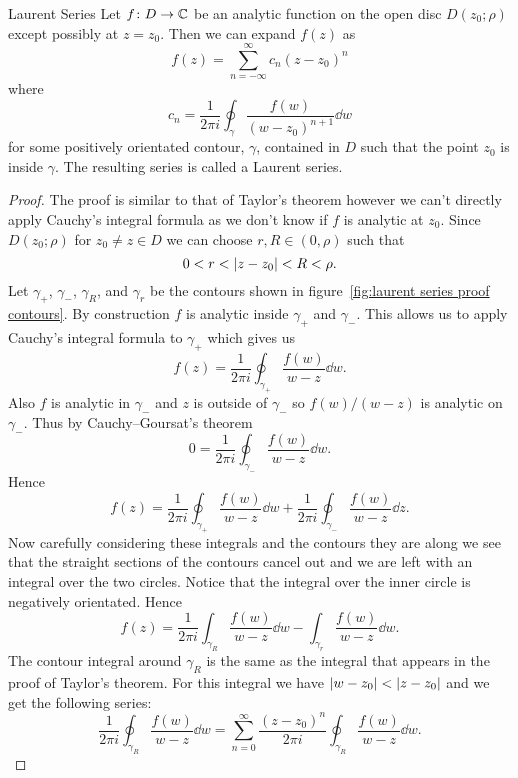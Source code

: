 \documentclass{article}
\newcommand{\discOpen}[2]{D\left({#1}; {#2}\right)}
\begin{document}
    \begin{theorem}{Laurent Series}{}
        Let \(f\colon D\to \mathbb{C}\) be an analytic function on the open disc \(\discOpen{z_0}{\rho}\) except possibly at \(z = z_0\).
        Then we can expand \(f(z)\) as
        \[f(z) = \sum_{n=-\infty}^{\infty} c_n(z - z_0)^n\]
        where
        \[c_n = \frac{1}{2\pi i}\oint_{\gamma} \frac{f(w)}{(w - z_0)^{n+1}}\dd{w}\]
        for some positively orientated contour, \(\gamma\), contained in \(D\) such that the point \(z_0\) is inside \(\gamma\).
        The resulting series is called a Laurent series.
    \end{theorem}
    \begin{proof}
        The proof is similar to that of Taylor's theorem however we can't directly apply Cauchy's integral formula as we don't know if \(f\) is analytic at \(z_0\).
        Since \(\discOpen{z_0}{\rho}\) for \(z_0\ne z \in D\) we can choose \(r, R\in(0, \rho)\) such that
        \[0 < r < \abs{z - z_0} < R < \rho.\]
        Let \(\gamma_+\), \(\gamma_-\), \(\gamma_R\), and \(\gamma_r\) be the contours shown in figure~\ref{fig:laurent series proof contours}.
        By construction \(f\) is analytic inside \(\gamma_+\) and \(\gamma_-\).
        This allows us to apply Cauchy's integral formula to \(\gamma_+\) which gives us
        \[f(z) = \frac{1}{2\pi i}\oint_{\gamma_+} \frac{f(w)}{w - z}\dd{w}.\]
        Also \(f\) is analytic in \(\gamma_-\) and \(z\) is outside of \(\gamma_-\) so \(f(w)/(w - z)\) is analytic on \(\gamma_-\).
        Thus by Cauchy--Goursat's theorem
        \[0 = \frac{1}{2\pi i}\oint_{\gamma_-}\frac{f(w)}{w - z}\dd{w}.\]
        Hence
        \[f(z) = \frac{1}{2\pi i}\oint_{\gamma_+}\frac{f(w)}{w - z}\dd{w} + \frac{1}{2\pi i}\oint_{\gamma_-}\frac{f(w)}{w - z}\dd{z}.\]
        Now carefully considering these integrals and the contours they are along we see that the straight sections of the contours cancel out and we are left with an integral over the two circles.
        Notice that the integral over the inner circle is negatively orientated.
        Hence
        \[f(z) = \frac{1}{2\pi i} \int_{\gamma_R} \frac{f(w)}{w - z}\dd{w} - \int_{\gamma_r}\frac{f(w)}{w - z}\dd{w}.\]
        The contour integral around \(\gamma_R\) is the same as the integral that appears in the proof of Taylor's theorem.
        For this integral we have \(\abs{w - z_0} < \abs{z - z_0}\) and we get the following series:
        \[\frac{1}{2\pi i}\oint_{\gamma_R} \frac{f(w)}{w - z}\dd{w} = \sum_{n=0}^{\infty} \frac{(z - z_0)^n}{2\pi i} \oint_{\gamma_R}\frac{f(w)}{w - z}\dd{w}.\]

\end{proof}
\end{document}
